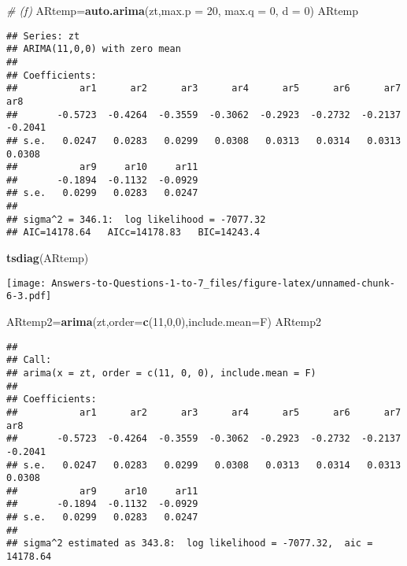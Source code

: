 \documentclass[
]{article}
\newenvironment{Shaded}{\begin{snugshade}}{\end{snugshade}}
\newcommand{\AttributeTok}[1]{\textcolor[rgb]{0.13,0.29,0.53}{#1}}
\newcommand{\CommentTok}[1]{\textcolor[rgb]{0.56,0.35,0.01}{\textit{#1}}}
\newcommand{\DecValTok}[1]{\textcolor[rgb]{0.00,0.00,0.81}{#1}}
\newcommand{\FunctionTok}[1]{\textcolor[rgb]{0.13,0.29,0.53}{\textbf{#1}}}
\newcommand{\NormalTok}[1]{#1}
\newcommand{\OtherTok}[1]{\textcolor[rgb]{0.56,0.35,0.01}{#1}}
\begin{document}
\begin{Shaded}
\begin{Highlighting}[]
\CommentTok{\# (f)}
\NormalTok{ARtemp}\OtherTok{=}\FunctionTok{auto.arima}\NormalTok{(zt,}\AttributeTok{max.p =} \DecValTok{20}\NormalTok{, }\AttributeTok{max.q =} \DecValTok{0}\NormalTok{, }\AttributeTok{d =} \DecValTok{0}\NormalTok{)}
\NormalTok{ARtemp}
\end{Highlighting}
\end{Shaded}

\begin{verbatim}
## Series: zt 
## ARIMA(11,0,0) with zero mean 
## 
## Coefficients:
##           ar1      ar2      ar3      ar4      ar5      ar6      ar7      ar8
##       -0.5723  -0.4264  -0.3559  -0.3062  -0.2923  -0.2732  -0.2137  -0.2041
## s.e.   0.0247   0.0283   0.0299   0.0308   0.0313   0.0314   0.0313   0.0308
##           ar9     ar10     ar11
##       -0.1894  -0.1132  -0.0929
## s.e.   0.0299   0.0283   0.0247
## 
## sigma^2 = 346.1:  log likelihood = -7077.32
## AIC=14178.64   AICc=14178.83   BIC=14243.4
\end{verbatim}

\begin{Shaded}
\begin{Highlighting}[]
\FunctionTok{tsdiag}\NormalTok{(ARtemp)}
\end{Highlighting}
\end{Shaded}

\texttt{[image: Answers-to-Questions-1-to-7\_files/figure-latex/unnamed-chunk-6-3.pdf]}

\begin{Shaded}
\begin{Highlighting}[]
\NormalTok{ARtemp2}\OtherTok{=}\FunctionTok{arima}\NormalTok{(zt,}\AttributeTok{order=}\FunctionTok{c}\NormalTok{(}\DecValTok{11}\NormalTok{,}\DecValTok{0}\NormalTok{,}\DecValTok{0}\NormalTok{),}\AttributeTok{include.mean=}\NormalTok{F)}
\NormalTok{ARtemp2}
\end{Highlighting}
\end{Shaded}

\begin{verbatim}
## 
## Call:
## arima(x = zt, order = c(11, 0, 0), include.mean = F)
## 
## Coefficients:
##           ar1      ar2      ar3      ar4      ar5      ar6      ar7      ar8
##       -0.5723  -0.4264  -0.3559  -0.3062  -0.2923  -0.2732  -0.2137  -0.2041
## s.e.   0.0247   0.0283   0.0299   0.0308   0.0313   0.0314   0.0313   0.0308
##           ar9     ar10     ar11
##       -0.1894  -0.1132  -0.0929
## s.e.   0.0299   0.0283   0.0247
## 
## sigma^2 estimated as 343.8:  log likelihood = -7077.32,  aic = 14178.64
\end{verbatim}
\end{document}
